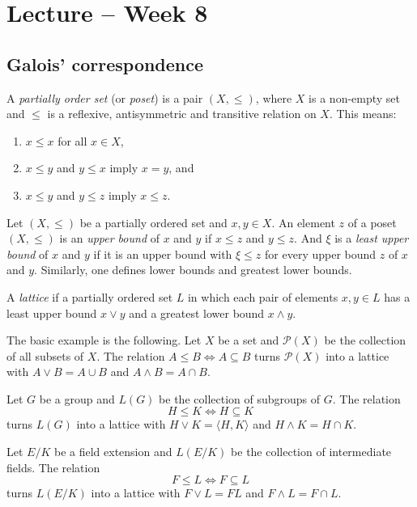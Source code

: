 \section{Lecture -- Week 8}

\subsection{Galois' correspondence}

A \emph{partially order set} (or \emph{poset}) is a pair $(X,\leq)$, where $X$ is a non-empty set
and $\leq$ is a reflexive, antisymmetric and transitive relation on $X$. This means:
\begin{enumerate}
    \item $x\leq x$ for all $x\in X$, 
    \item $x\leq y$ and $y\leq x$ imply $x=y$, and 
    \item $x\leq y$ and $y\leq z$ imply $x\leq z$. 
\end{enumerate}
Let $(X,\leq)$ be a partially ordered set and $x,y\in X$. 
An element $z$ of a poset $(X,\leq)$ is an \emph{upper bound} of $x$ and $y$ if 
$x\leq z$ and $y\leq z$. And $\xi$ 
is a \emph{least upper bound} of $x$ and $y$ 
if it is an upper bound with $\xi\leq z$ for every upper bound $z$ of $x$ and $y$. 
Similarly, one defines lower bounds and greatest lower bounds. 

\begin{definition}
    A \emph{lattice} if a partially ordered set $L$ in which 
    each pair of elements $x,y\in L$ has a least upper bound $x\vee y$ and a
    greatest lower bound $x\wedge y$. 
\end{definition}

The basic example is the following. 
Let $X$ be a set and $\mathcal{P}(X)$ be the collection of all subsets of $X$. The relation 
$A\leq B\Longleftrightarrow A\subseteq B$
turns $\mathcal{P}(X)$ into a lattice 
with $A\vee B=A\cup B$ and $A\wedge B=A\cap B$. 

\begin{example}
    Let $G$ be a group and $L(G)$ be the collection of subgroups of $G$. The relation
    \[ 
    H\leq K\Longleftrightarrow H\subseteq K
    \] 
    turns $L(G)$ into a lattice 
    with $H\vee K=\langle H,K\rangle$ and 
    $H\wedge K=H\cap K$. 
\end{example}

\begin{example}
    Let $E/K$ be a field extension and $L(E/K)$ be the collection of 
    intermediate fields. The relation
    \[
    F\leq L\Longleftrightarrow F\subseteq L
    \]
    turns $L(E/K)$ into a lattice with 
    $F\vee L=FL$ and $F\wedge L=F\cap L$. 
\end{example}

